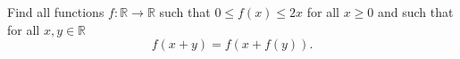Find all functions $f\colon \mathbb{R}\to \mathbb{R}$ such that $0\leq f(x)\leq 2x$
for all $x\geq 0$ and such that for all $x,y\in \mathbb{R}$
$$f(x+y)=f(x+f(y)).$$
